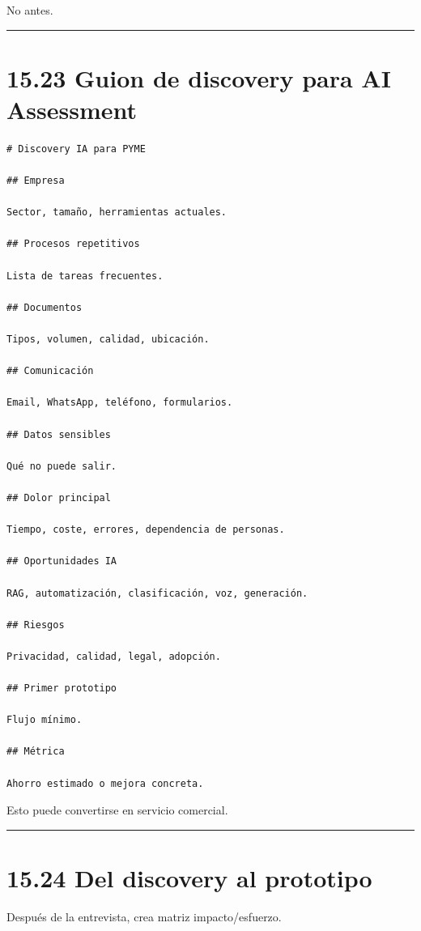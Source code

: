 No antes.

\begin{center}\rule{0.5\linewidth}{0.5pt}\end{center}

\section{15.23 Guion de discovery para AI
Assessment}\label{guion-de-discovery-para-ai-assessment}

\begin{lstlisting}
# Discovery IA para PYME

## Empresa

Sector, tamaño, herramientas actuales.

## Procesos repetitivos

Lista de tareas frecuentes.

## Documentos

Tipos, volumen, calidad, ubicación.

## Comunicación

Email, WhatsApp, teléfono, formularios.

## Datos sensibles

Qué no puede salir.

## Dolor principal

Tiempo, coste, errores, dependencia de personas.

## Oportunidades IA

RAG, automatización, clasificación, voz, generación.

## Riesgos

Privacidad, calidad, legal, adopción.

## Primer prototipo

Flujo mínimo.

## Métrica

Ahorro estimado o mejora concreta.
\end{lstlisting}

Esto puede convertirse en servicio comercial.

\begin{center}\rule{0.5\linewidth}{0.5pt}\end{center}

\section{15.24 Del discovery al
prototipo}\label{del-discovery-al-prototipo}

Después de la entrevista, crea matriz impacto/esfuerzo.

